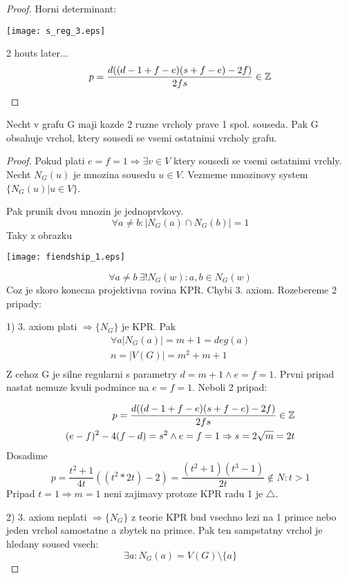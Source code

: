 \begin{proof}
	Horni determinant:

	\texttt{[image: s\_reg\_3.eps]}

	2 houts later...
	\[ p = \frac{d((d - 1 + f - e)(s + f - e) - 2f)}{2fs} \in \operatorname{\mathbb{Z}} \]
\end{proof}

\begin{theorem}
	Necht v grafu G maji kazde 2 ruzne vrcholy prave 1 spol. souseda.
	Pak G obsahuje vrchol, ktery sousedi se vsemi ostatnimi vrcholy grafu.
\end{theorem}
\begin{proof}
	Pokud plati $ e = f = 1 \Rightarrow \exists v \in V$ ktery sousedi se vsemi ostatnimi vrchly. \\
	Necht $N_G(u)$ je mnozina sousedu $u \in V$. Vezmeme mnozinovy system $\{ N_G(u) | u \in V \}$.

	Pak prunik dvou mnozin je jednoprvkovy.
	\[ \forall a \ne b: |N_G(a) \cap N_G(b)| = 1 \]
	Taky z obrazku

	\texttt{[image: fiendship\_1.eps]}

	\[ \forall a \ne b\ \exists! N_G(w): a,b \in N_G(w) \]
	Coz je skoro konecna projektivna rovina KPR. Chybi 3. axiom. Rozebereme 2 pripady:

	1) 3. axiom plati $\Rightarrow \{N_G\}$ je KPR. Pak
	\begin{equation*}
	\begin{split}
		\forall a |N_G(a)| = m + 1 = deg(a) \\
		n = |V(G)| = m^2 + m + 1\\
	\end{split}
	\end{equation*}
	Z cehoz G je silne regularni s parametry $ d = m + 1 \land e = f = 1$. Prvni pripad nastat nemuze kvuli podmince na $e = f = 1$. Neboli 2 pripad:

	\begin{equation*}
	\begin{aligned}
		p = \frac{d((d - 1 + f - e)(s + f - e) - 2f)}{2fs} \in \operatorname{\mathbb{Z}} \\
		(e - f)^2 - 4 (f - d) = s^2 \land e = f = 1 \Rightarrow s = 2 \sqrt{m} = 2t
	\end{aligned}
	\end{equation*}
	Dosadime
	\[ p = \frac{t^2 + 1}{4t}((t^2 * 2t) - 2) = \frac{(t^2 + 1)(t^3 - 1)}{2t} \notin N : t > 1 \]
	Pripad $t = 1 \Rightarrow m = 1$ neni zajimavy protoze KPR radu 1 je $\triangle$.

	2) 3. axiom neplati $\Rightarrow \{N_G\}$ z teorie KPR bud vsechno lezi na 1 primce nebo jeden vrchol samostatne a zbytek na primce. Pak ten sampstatny vrchol je hledany soused vsech:
	\[ \exists a : N_G(a) = V(G)\setminus \{a\} \]

\end{proof}
